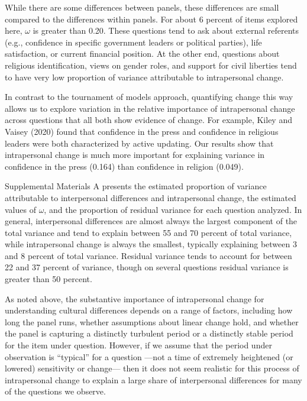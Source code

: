 \documentclass[
  12pt,
]{article}
\begin{document}
While there are some differences between panels, these differences are
small compared to the differences within panels. For about 6 percent of
items explored here, \(\omega\) is greater than 0.20. These questions
tend to ask about external referents (e.g., confidence in specific
government leaders or political parties), life satisfaction, or current
financial position. At the other end, questions about religious
identification, views on gender roles, and support for civil liberties
tend to have very low proportion of variance attributable to
intrapersonal change.

In contrast to the tournament of models approach, quantifying change
this way allows us to explore variation in the relative importance of
intrapersonal change across questions that all both show evidence of
change. For example, Kiley and Vaisey (2020) found that confidence in
the press and confidence in religious leaders were both characterized by
active updating. Our results show that intrapersonal change is much more
important for explaining variance in confidence in the press (0.164)
than confidence in religion (0.049).

Supplemental Materials A presents the estimated proportion of variance
attributable to interpersonal differences and intrapersonal change, the
estimated values of \(\omega\), and the proportion of residual variance
for each question analyzed. In general, interpersonal differences are
almost always the largest component of the total variance and tend to
explain between 55 and 70 percent of total variance, while intrapersonal
change is always the smallest, typically explaining between 3 and 8
percent of total variance. Residual variance tends to account for
between 22 and 37 percent of variance, though on several questions
residual variance is greater than 50 percent.

As noted above, the substantive importance of intrapersonal change for
understanding cultural differences depends on a range of factors,
including how long the panel runs, whether assumptions about linear
change hold, and whether the panel is capturing a distinctly turbulent
period or a distinctly stable period for the item under question.
However, if we assume that the period under observation is ``typical''
for a question ---not a time of extremely heightened (or lowered)
sensitivity or change--- then it does not seem realistic for this
process of intrapersonal change to explain a large share of
interpersonal differences for many of the questions we observe.
\end{document}
